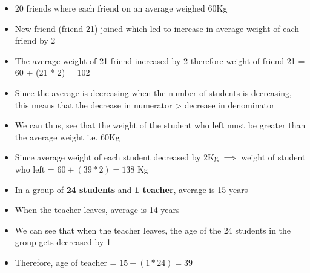 \begin{itemize}
    \item 20 friends where each friend on an average weighed 60Kg
    \item New friend (friend 21) joined which led to increase in average weight of each friend by 2
    \item The average weight of 21 friend increased by 2 therefore weight of friend 21 = 60 + (21 * 2) = 102
\end{itemize}


\begin{itemize}
    \item Since the average is decreasing when the number of students is decreasing, this means that the decrease in numerator > decrease in denominator
    \item We can thus, see that the weight of the student who left must be greater than the average weight i.e. 60Kg
    \item Since average weight of each student decreased by 2Kg $\implies$ weight of student who left = $60 + (39 * 2) = 138$ Kg
\end{itemize}



\begin{itemize}
    \item In a group of \textbf{24 students} and \textbf{1 teacher}, average is 15 years
    \item When the teacher leaves, average is 14 years
    \item We can see that when the teacher leaves, the age of the 24 students in the group gets decreased by 1
    \item Therefore, age of teacher = $15 + (1 * 24) = 39$
\end{itemize}


